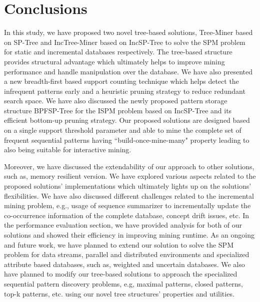 \section{Conclusions} \label{conclusion}
In this study, we have proposed two novel tree-based solutions, Tree-Miner based on SP-Tree and IncTree-Miner based on IncSP-Tree to solve the SPM problem for static and incremental databases respectively. The tree-based structure provides structural advantage which ultimately helps to improve mining performance and handle manipulation over the database. We have also presented a new breadth-first based support counting technique which helps detect the infrequent patterns early and a heuristic pruning strategy to reduce redundant search space. We have also discussed the newly proposed pattern storage structure BPFSP-Tree for the ISPM problem based on IncSP-Tree and its efficient bottom-up pruning strategy. Our proposed solutions are designed based on a single support threshold parameter and able to mine the complete set of frequent sequential patterns having ``build-once-mine-many" property leading to also being suitable for interactive mining. 


Moreover, we have discussed the extendability of our approach to other solutions, such as, memory resilient version. We have explored various aspects related to the proposed solutions' implementations which ultimately lights up on the solutions' flexibilities. We have also discussed different challenges related to the incremental mining problem, e.g., usage of sequence summarizer to incrementally update the co-occurrence information of the complete database, concept drift issues, etc. In the performance evaluation section, we have provided analysis for both of our solutions and showed their efficiency in improving mining runtime. As an ongoing and future work, we have planned to extend our solution to solve the SPM problem for data streams, parallel and distributed environments and specialized attribute based databases, such as, weighted and uncertain databases. We also have planned to modify our tree-based solutions to approach the specialized sequential pattern discovery problems, e.g, maximal patterns, closed patterns, top-k patterns, etc. using our novel tree structures' properties and utilities.  
